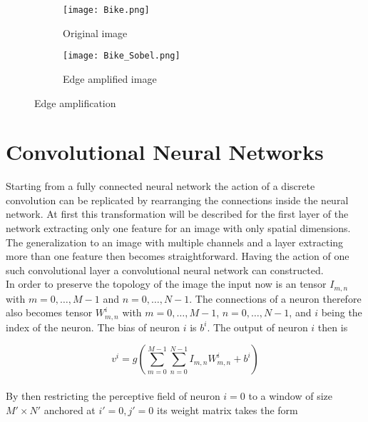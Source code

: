 \begin{figure}
\centering
\begin{subfigure}{.5\textwidth}
  \centering
  \texttt{[image: Bike.png]}
  \caption{Original image}
  \label{fig:sub1}
\end{subfigure}%
\begin{subfigure}{.5\textwidth}
  \centering
  \texttt{[image: Bike\_Sobel.png]}
  \caption{Edge amplified image}
  \label{fig:sub2}
\end{subfigure}
\caption{Edge amplification}
\label{fig:Sobel}
\end{figure}

\section{Convolutional Neural Networks}

Starting from a fully connected neural network the action of a discrete convolution can be replicated by rearranging the connections inside the neural network. At first this transformation will be described for the first layer of the network extracting only one feature for an image with only spatial dimensions. The generalization to an image with multiple channels and a layer extracting more than one feature then becomes straightforward. Having the action of one such convolutional layer a convolutional neural network can constructed. \\

In order to preserve the topology of the image the input now is an tensor $I_{m,n}$ with $m=0,\dots ,M-1$ and $n=0,\dots ,N-1$. The connections of a neuron therefore also becomes tensor $W_{m,n}^i$ with $m=0,\dots ,M-1$, $n=0,\dots ,N-1$, and $i$ being the index of the neuron. The bias of neuron $i$ is $b^i$. The output of neuron $i$ then is

\begin{equation}
v^i = g\left( \sum_{m=0}^{M-1} \sum_{n=0}^{N-1} I_{m,n} W_{m,n}^i + b^i \right)
\end{equation} \\
By then restricting the perceptive field of neuron $i=0$ to a window of size $M'\times N'$ anchored at $i'=0,j'=0$ its weight matrix takes the form


